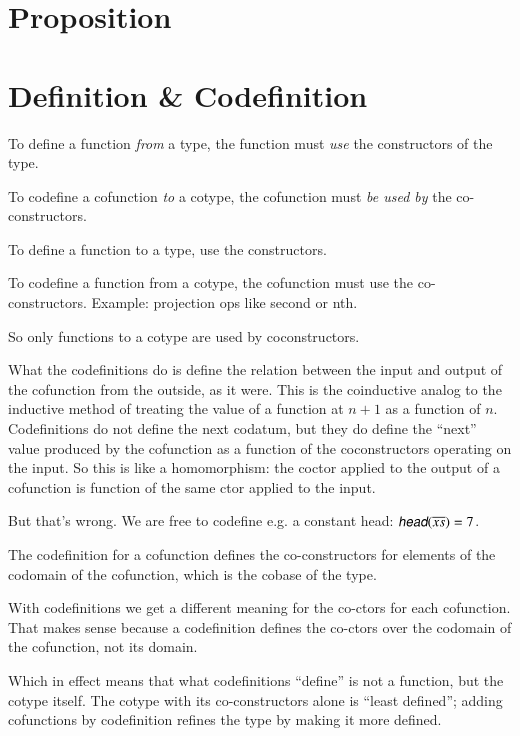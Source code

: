 \documentclass{article}
\begin{document}
\section{Proposition}



\section{Definition \& Codefinition}

To define a function \textit{from} a type, the function must
\textit{use} the constructors of the type.

To codefine a cofunction \textit{to} a cotype, the cofunction must
\textit{be used by} the co-constructors.

To define a function to a type, use the constructors.

To codefine a function from a cotype, the cofunction must use the
co-constructors. Example: projection ops like \textsf{second} or
\textsf{nth}.

So only functions to a cotype are used by coconstructors.

What the codefinitions do is define the relation between the input and
output of the cofunction from the outside, as it were. This is the
coinductive analog to the inductive method of treating the value of a
function at \(n+1\) as a function of \(n\). Codefinitions do not
define the next codatum, but they do define the ``next'' value
produced by the cofunction as a function of the coconstructors
operating on the input. So this is like a homomorphism: the coctor
applied to the output of a cofunction is function of the same ctor
applied to the input.

But that's wrong. We are free to codefine e.g. a constant head:
\mbox{\(\cohead(\coseq{x}) = 7\)}.

The codefinition for a cofunction defines the co-constructors for
elements of the codomain of the cofunction, which is the cobase of the
type.

With codefinitions we get a different meaning for the co-ctors for
each cofunction. That makes sense because a codefinition defines the
co-ctors over the codomain of the cofunction, not its domain.

Which in effect means that what codefinitions ``define'' is not a
function, but the cotype itself. The cotype with its co-constructors
alone is ``least defined''; adding cofunctions by codefinition refines
the type by making it more defined.
\end{document}
